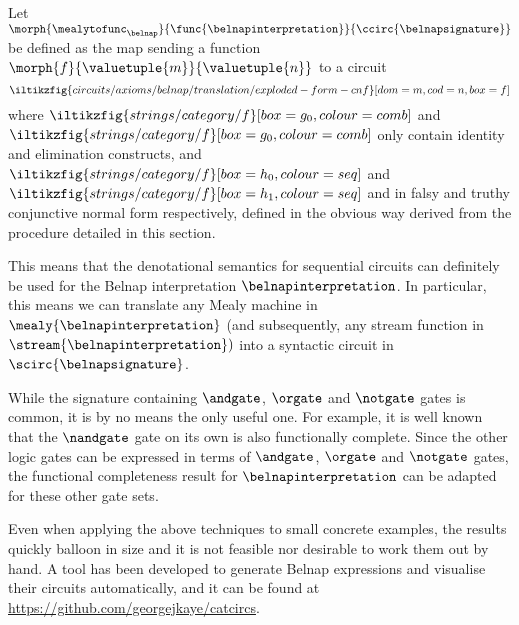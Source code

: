 \begin{definition}
    Let \(\morph{\mealytofunc_\belnap}{\func{\belnapinterpretation}}{\ccirc{\belnapsignature}}\)
    be defined as the map sending a function \(\morph{f}{\valuetuple{m}}{\valuetuple{n}}\)
    to a circuit \[
        \iltikzfig{circuits/axioms/belnap/translation/exploded-form-cnf}[dom=m,cod=n,box=f]
    \] where \(
    \iltikzfig{strings/category/f}[box=g_0,colour=comb]
    \) and \(
    \iltikzfig{strings/category/f}[box=g_0,colour=comb]
    \) only contain identity and elimination constructs, and \(
    \iltikzfig{strings/category/f}[box=h_0,colour=seq]
    \) and \(
    \iltikzfig{strings/category/f}[box=h_1,colour=seq]
    \) and in falsy and truthy conjunctive normal form respectively, defined
    in the obvious way derived from the procedure detailed in this section.
\end{definition}

This means that the denotational semantics for sequential circuits can
definitely be used for the Belnap interpretation \(\belnapinterpretation\).
In particular, this means we can translate any Mealy machine in
\(\mealy{\belnapinterpretation}\) (and subsequently, any stream function in
\(\stream{\belnapinterpretation})\) into a syntactic circuit in
\(\scirc{\belnapsignature}\).

While the signature containing \(\andgate\), \(\orgate\) and \(\notgate\) gates
is common, it is by no means the only useful one.
For example, it is well known that the \(\nandgate\) gate on its own is also
functionally complete.
Since the other logic gates can be expressed in terms of \(\andgate\),
\(\orgate\) and \(\notgate\) gates, the functional completeness result for
\(\belnapinterpretation\) can be adapted for these other gate sets.

Even when applying the above techniques to small concrete examples,
the results quickly balloon in size and it is not feasible nor desirable to work
them out by hand.
A tool has been developed to generate Belnap expressions and
visualise their circuits automatically, and it can be found at
\url{https://github.com/georgejkaye/catcircs}.